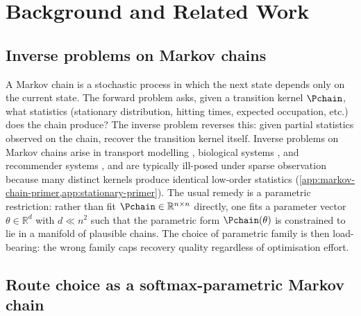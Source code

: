\section{Background and Related Work}\label{sec:background}

\subsection{Inverse problems on Markov chains}
\label{sec:inverse-mc}

A Markov chain is a stochastic process in which the next state depends
only on the current state. The forward problem asks, given a
transition kernel $\Pchain$, what statistics (stationary distribution,
hitting times, expected occupation, etc.) does the chain produce? The
inverse problem reverses this: given partial statistics observed
on the chain, recover the transition kernel itself. Inverse problems on
Markov chains arise in transport modelling \cite{ben-akiva1985},
biological systems \cite{noe2008}, and recommender systems
\cite{huang2018}, and are typically ill-posed under sparse observation
because many distinct kernels produce identical low-order statistics
(\cref{app:markov-chain-primer,app:stationary-primer}).
The usual remedy is a parametric restriction: rather than fit
$\Pchain \in \mathbb{R}^{n \times n}$ directly, one fits a parameter
vector $\theta \in \mathbb{R}^d$ with $d \ll n^2$ such that the
parametric form $\Pchain(\theta)$ is constrained to lie in a manifold of
plausible chains. The choice of parametric family is then load-bearing:
the wrong family caps recovery quality regardless of optimisation
effort.

\subsection{Route choice as a softmax-parametric Markov chain}
\label{sec:route-softmax}


